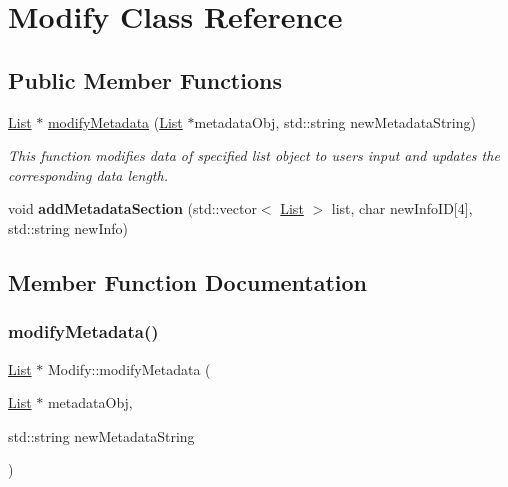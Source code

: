 \hypertarget{classModify}{}\section{Modify Class Reference}
\label{classModify}
\subsection*{Public Member Functions}
\begin{DoxyCompactItemize}
\item 
\hyperlink{structList}{List} $\ast$ \hyperlink{classModify_a7687f4996264b9dee1ac335856be7be4}{modify\+Metadata} (\hyperlink{structList}{List} $\ast$metadata\+Obj, std\+::string new\+Metadata\+String)
\begin{DoxyCompactList}\small\item\em This function modifies data of specified list object to user\textquotesingle{}s input and updates the corresponding data length. \end{DoxyCompactList}\item 
\mbox{\label{classModify_aa7f1bf33dbcb800828d846edeb35fc56}} 
void {\bfseries add\+Metadata\+Section} (std\+::vector$<$ \hyperlink{structList}{List} $>$ list, char new\+Info\+ID\mbox{[}4\mbox{]}, std\+::string new\+Info)
\end{DoxyCompactItemize}


\subsection{Member Function Documentation}
\mbox{\label{classModify_a7687f4996264b9dee1ac335856be7be4}} 
\subsubsection{\texorpdfstring{modify\+Metadata()}{modifyMetadata()}}
{\footnotesize\ttfamily \hyperlink{structList}{List} $\ast$ Modify\+::modify\+Metadata (\begin{DoxyParamCaption}\item[{\hyperlink{structList}{List} $\ast$}]{metadata\+Obj,  }\item[{std\+::string}]{new\+Metadata\+String }\end{DoxyParamCaption})}



